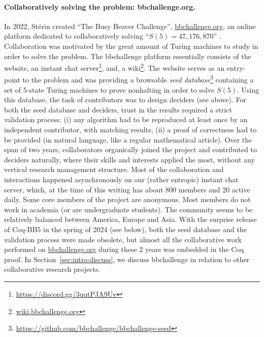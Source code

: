 \documentclass[a4paper,british]{article}
\theoremstyle{definition} %
\numberwithin{equation}{section}
\theoremstyle{definition} %
\newcommand{\BBtheFifth}{47{,}176{,}870}
\newcommand{\CoqBB}{Coq-BB5\xspace}
\begin{document}
\paragraph{Collaboratively solving the problem: bbchallenge.org.} In 2022, Stérin created ``The Busy Beaver Challenge'', \url{bbchallenge.org}, an online platform dedicated to collaboratively solving ``$S(5)=\BBtheFifth$'' \cite{sterin_2022_14955828}. Collaboration was motivated by the great amount of Turing machines to study in order to solve the problem. The bbchallenge platform essentially consists of the website, an instant chat server\footnote{\url{https://discord.gg/3uqtPJA9Uv}}, and, a wiki\footnote{\url{wiki.bbchallenge.org}}. The website serves as an entry-point to the problem and was providing a browsable \textit{seed database}\footnote{\url{https://github.com/bbchallenge/bbchallenge-seed}} containing a set of 5-state Turing machines to prove nonhalting in order to solve $S(5)$. Using this database, the task of contributors was to design deciders (see above). For both the seed database and deciders, trust in the results required a strict validation process: (i) any algorithm had to be reproduced at least once by an independent contributor, with matching results, (ii) a proof of correctness had to be provided (in natural language, like a regular mathematical article). Over the span of two years, collaborators organically joined the project and contributed to deciders naturally, where their skills and interests applied the most, without any vertical research management structure. Most of the collaboration and interactions happened asynchronously on our (rather entropic) instant chat server, which, at the time of this writing has about 800 members and 20 active daily.  Some core members of the project are anonymous. Most members do not work in academia (or are undergraduate students). The community seems to be relatively balanced between America, Europe and Asia. With the surprise release of \CoqBB in the spring of 2024 (see below), both the seed database and the validation process were made obsolete, but almost all the collaborative work performed on \url{bbchallenge.org} during these 2 years was embedded in the Coq proof. In Section~\ref{sec:intro:discuss}, we discuss bbchallenge in relation to other collaborative research projects.
\end{document}
